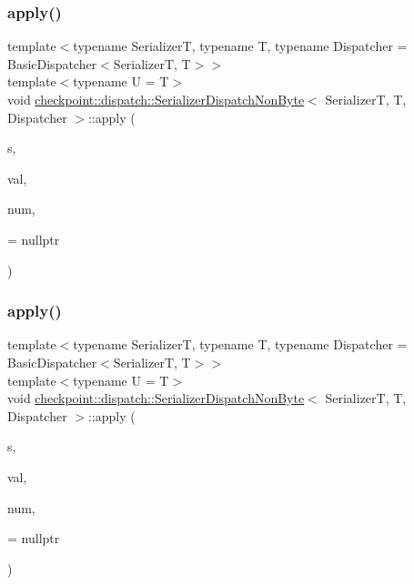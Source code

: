 \subsubsection{\texorpdfstring{apply()}{apply()}\hspace{0.1cm}{\footnotesize\ttfamily [1/2]}}
{\footnotesize\ttfamily template$<$typename SerializerT, typename T, typename Dispatcher = Basic\+Dispatcher$<$\+Serializer\+T, T$>$$>$ \\
template$<$typename U  = T$>$ \\
void \hyperlink{structcheckpoint_1_1dispatch_1_1_serializer_dispatch_non_byte}{checkpoint\+::dispatch\+::\+Serializer\+Dispatch\+Non\+Byte}$<$ SerializerT, T, Dispatcher $>$\+::apply (\begin{DoxyParamCaption}\item[{SerializerT \&}]{s,  }\item[{T $\ast$}]{val,  }\item[{\hyperlink{namespacecheckpoint_a083f6674da3f94c2901b18c6d238217c}{Serial\+Size\+Type}}]{num,  }\item[{has\+Virtual\+Serialize$<$ U $>$ $\ast$}]{ = {\ttfamily nullptr} }\end{DoxyParamCaption})\hspace{0.3cm}{\ttfamily [inline]}}

\mbox{\label{structcheckpoint_1_1dispatch_1_1_serializer_dispatch_non_byte_ae6e291caec4d650a7d91e78a209a1964}} 
\subsubsection{\texorpdfstring{apply()}{apply()}\hspace{0.1cm}{\footnotesize\ttfamily [2/2]}}
{\footnotesize\ttfamily template$<$typename SerializerT, typename T, typename Dispatcher = Basic\+Dispatcher$<$\+Serializer\+T, T$>$$>$ \\
template$<$typename U  = T$>$ \\
void \hyperlink{structcheckpoint_1_1dispatch_1_1_serializer_dispatch_non_byte}{checkpoint\+::dispatch\+::\+Serializer\+Dispatch\+Non\+Byte}$<$ SerializerT, T, Dispatcher $>$\+::apply (\begin{DoxyParamCaption}\item[{SerializerT \&}]{s,  }\item[{T $\ast$}]{val,  }\item[{\hyperlink{namespacecheckpoint_a083f6674da3f94c2901b18c6d238217c}{Serial\+Size\+Type}}]{num,  }\item[{has\+Not\+Virtual\+Serialize$<$ U $>$ $\ast$}]{ = {\ttfamily nullptr} }\end{DoxyParamCaption})\hspace{0.3cm}{\ttfamily [inline]}}

